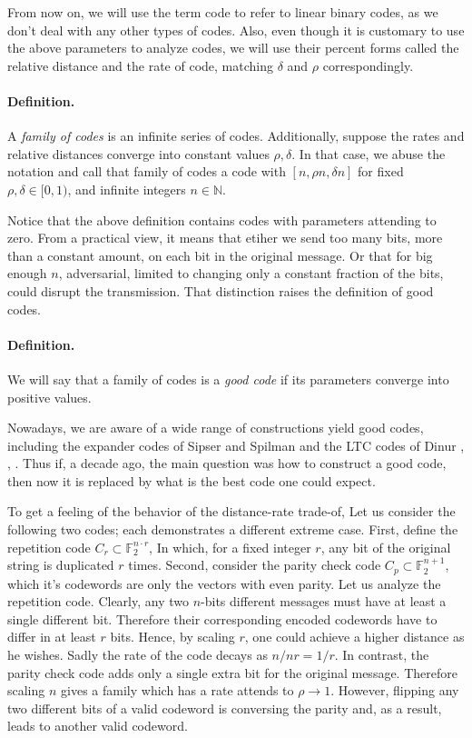 \documentclass{article}
\begin{document}
\begin{multicols*}{2}
From now on, we will use the term code to refer to linear binary codes, as we don't deal with any other types of codes. Also, even though it is customary to use the above parameters to analyze codes, we will use their percent forms called the relative distance and the rate of code, matching $\delta$ and $\rho$ correspondingly.     
\paragraph{Definition.} A \textit{family of codes} is an infinite series of codes. Additionally, suppose the rates and relative distances converge into constant values $\rho,\delta$. In that case, we abuse the notation and call that family of codes a code with $[n, \rho n, \delta n]$ for fixed $\rho, \delta\in [ 0,1 )$, and infinite integers $n \in \mathbb{N}$.     

Notice that the above definition contains codes with parameters attending to zero. From a practical view, it means that etiher we send too many bits, more than a constant amount, on each bit in the original message. Or that for big enough $n$, adversarial, limited to changing only a constant fraction of the bits, could disrupt the transmission. That distinction raises the definition of good codes.

\paragraph{Definition.}We will say that a family of codes is a \textit{good code} if its parameters converge into positive values. 


Nowadays, we are aware of a wide range of constructions yield good codes, including the expander codes of Sipser and Spilman \cite{ExpanderCodes} and the LTC codes of Dinur \cite{Dinur}, \cite{Pavel}, \cite{leverrier2022quantum}. Thus if, a decade ago, the main question was how to construct a good code, then now it is replaced by what is the best code one could expect.   

To get a feeling of the behavior of the distance-rate trade-of, Let us consider the following two codes; each demonstrates a different extreme case. First, define the repetition code $C_{r} \subset \mathbb{F}_{2}^{n \cdot r}$, In which, for a fixed integer $r$, any bit of the original string is duplicated $r$ times. Second, consider the parity check code $C_{p} \subset \mathbb{F}_{2}^{n+1}$, which it's codewords are only the vectors with even parity. Let us analyze the repetition code. Clearly, any two $n$-bits different messages must have at least a single different bit. Therefore their corresponding encoded codewords have to differ in at least $r$ bits. Hence, by scaling $r$, one could achieve a higher distance as he wishes. Sadly the rate of the code decays as $n/nr = 1/r$. In contrast, the parity check code adds only a single extra bit for the original message. Therefore scaling $n$ gives a family which has a rate attends to $\rho \rightarrow 1$. However, flipping any two different bits of a valid codeword is conversing the parity and, as a result, leads to another valid codeword.


\end{multicols*}
\end{document}
